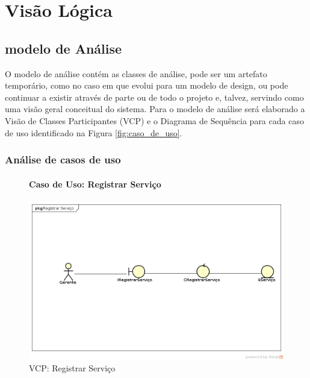 \documentclass[
	12pt,				%
	openright,
	oneside,			%
	a4paper,			%
	chapter=TITLE,		%
	brazil				%
	]{abntex2}
\begin{document}
\newpage
\chapter{Visão Lógica}

\section{modelo de Análise}
	O modelo de análise contém as classes de análise, pode ser um artefato temporário, como no caso em que evolui para um modelo de design, ou pode continuar a existir através de parte ou de todo o projeto e, talvez, servindo como uma visão geral conceitual do sistema. Para o modelo de análise será elaborado a Visão de Classes Participantes (VCP) e o Diagrama de Sequência para cada caso de uso identificado na Figura \ref{fig:caso_de_uso}.


\subsection{Análise de casos de uso}



\begin{figure}[h!]

\subsubsection*{Caso de Uso: Registrar Serviço}	
	
	\caption{VCP: Registrar Serviço}
	\begin{center}
	    \includegraphics[scale=0.5]{Arquivos/Analise/V_registrar_servico}  
	\end{center}
\end{figure}
\end{document}
